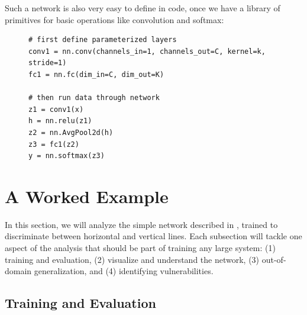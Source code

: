 Such a network is also very easy to define in code, once we have a library of primitives for basic operations like convolution and softmax:

\begin{figure}[h]
\begin{minipage}{1.0\linewidth}
\begin{verbatim}
# first define parameterized layers
conv1 = nn.conv(channels_in=1, channels_out=C, kernel=k, stride=1)
fc1 = nn.fc(dim_in=C, dim_out=K)

# then run data through network
z1 = conv1(x)
h = nn.relu(z1)
z2 = nn.AvgPool2d(h)
z3 = fc1(z2)
y = nn.softmax(z3)
\end{verbatim}
\end{minipage}
\end{figure}



\section{A Worked Example}

In this section, we will analyze the simple network described in \sect{\ref{sec:convolutional_neural_nets:simple_CNN}}, trained to discriminate between horizontal and vertical lines. Each subsection will tackle one aspect of the analysis that should be part of training any large system: (1) training and evaluation, (2) visualize and understand the network, (3) out-of-domain generalization, and (4) identifying vulnerabilities. 

\subsection{Training and Evaluation}

